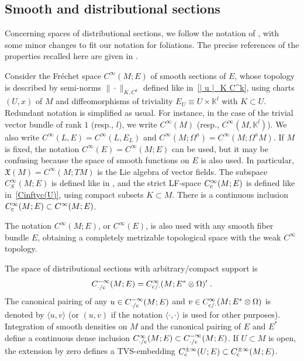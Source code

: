 \documentclass{memo-l}
\theoremstyle{plain}
\theoremstyle{definition}
\theoremstyle{remark}
\newcommand{\K}{\mathbb{K}}
\newcommand{\fX}{\mathfrak{X}}
\newcommand{\co}{{\text{\rm c}}}
\newcommand{\Cinftyc}{C^\infty_{\text{\rm c}}}
\numberwithin{section}{chapter}
\numberwithin{equation}{section}%
\begin{document}
\subsection{Smooth and distributional sections}\label{ss: smooth/distributional sections}

Concerning spaces of distributional sections, we follow the notation of \cite{Melrose1996,Hormander1983-I,Hormander1985-III}, with some minor changes to fit our notation for foliations. The precise references of the properties recalled here are given in \cite[Section~2.4]{AlvKordyLeichtnam-conormal}.

Consider the Fr\'echet space $C^\infty(M;E)$ of smooth sections of $E$, whose topology is described by semi-norms $\|{\cdot}\|_{K,C^k}$ defined like in~\eqref{| u |_K C^k}, using charts $(U,x)$ of $M$ and diffeomorphisms of triviality $E_U\equiv U\times\K^l$ with $K\subset U$. Redundant notation is simplified as usual. For instance, in the case of the trivial vector bundle of rank $1$ (resp., $l$), we write $C^\infty(M)$ (resp., $C^\infty(M,\K^l)$). We also write $C^\infty(L,E)=C^\infty(L,E_L)$ and $C^\infty(M;\Omega^a)=C^\infty(M;\Omega^aM)$. If $M$ is fixed, the notation $C^\infty(E)=C^\infty(M;E)$ can be used, but it may be confusing because the space of smooth functions on $E$ is also used. In particular, $\fX(M)=C^\infty(M;TM)$ is the Lie algebra of vector fields. The subspace $C^\infty_S(M;E)$  is defined like in , and the strict LF-space $\Cinftyc(M;E)$ \index{$C^{\pm\infty}_{{\cdot}/\co}(M;E)$} is defined like in~\eqref{Cinftyc(U)}, using compact subsets $K\subset M$. There is a continuous inclusion $\Cinftyc(M;E)\subset C^\infty(M;E)$.

The notation $C^\infty(M;E)$, or $C^\infty(E)$, is also used with any smooth fiber bundle $E$, obtaining a completely metrizable topological space with the weak $C^\infty$ topology.

The space of distributional sections with arbitrary/compact support is
\begin{equation}\label{C^-infty_cdot/c(M;E)}
C^{-\infty}_{{\cdot}/\co}(M;E)=C^\infty_{\co/{\cdot}}(M;E^*\otimes\Omega)'\;.
\end{equation}
The canonical pairing of any $u\in C^{-\infty}_{{\cdot}/\co}(M;E)$ and $v\in C^\infty_{\co/{\cdot}}(M;E^*\otimes\Omega)$ is denoted by $\langle u,v\rangle$ (or $(u,v)$ if the notation $\langle{\cdot},{\cdot}\rangle$ is used for other purposes). Integration of smooth densities on $M$ and the canonical pairing of $E$ and $E^*$ define a continuous dense inclusion $C^\infty_{{\cdot}/\co}(M;E)\subset C^{-\infty}_{{\cdot}/\co}(M;E)$. If $U\subset M$ is open, the extension by zero defines a TVS-embedding $C^{\pm\infty}_\co(U;E)\subset C^{\pm\infty}_\co(M;E)$. 
\end{document}
